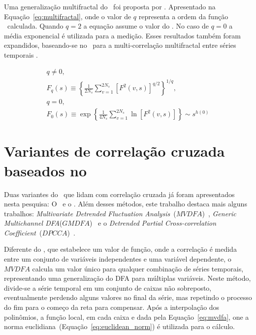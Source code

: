 Uma generalização multifractal do \dfa~foi proposta por . Apresentado na Equação~\ref{eq:multifractal}, onde o valor de $q$ representa a ordem da função \dfa~calculada. Quando $q=2$ a equação assume o valor do \dfa. No caso de $q=0$ a média exponencial é utilizada para a medição. Esses resultados também foram expandidos, baseando-se no \dcca~para a multi-correlação multifractal entre séries temporais \cite{zhouMultifractalDetrendedCrosscorrelation2008}.

\begin{equation}\label{eq:multifractal}
  \begin{split}
  q \neq 0,
  \\[10pt]
  F_q(s) \equiv \left\{ \frac{1}{2N_s} \sum_{v=1}^{2N_s} \left[ F^2(v,s) \right]^{q/2} \right\}^{1/q},
  \\[10pt]
  q=0,
  \\[10pt]
  F_0(s) \equiv \exp\left\{ \frac{1}{4N_s} \sum_{v=1}^{2N_s} \ln\left[ F^2(v,s) \right] \right\} \sim s^{h(0)}
  \end{split}
  \end{equation}

\section{Variantes de correlação cruzada baseados no \dcca}
\label{ss:vari_cross}

Duas variantes do \dcca~que lidam com correlação cruzada já foram apresentados nesta pesquisa: O \pdcca~e o \dmc. Além desses métodos, este trabalho destaca mais alguns trabalhos: \textit{Multivariate Detrended Fluctuation Analysis}~($MVDFA$)~\cite{xiongDetrendedFluctuationAnalysis2017}, \textit{Generic Multichannel DFA}($GMDFA$)~\cite{naveedFullyMultivariateDetrended2025} e o \textit{Detrended Partial Cross-correlation Coefficient}~($DPCCA$)~\cite{yuanDetrendedPartialCrossCorrelationAnalysis2015}.

Diferente do \dmc, que estabelece um valor de função, onde a correlação é medida entre um conjunto de variáveis independentes e uma variável dependente, o $MVDFA$ calcula um valor único para qualquer combinação de séries temporais, representando uma generalização do DFA para múltiplas variáveis. Neste método, divide-se a série temporal em um conjunto de caixas não sobreposto, eventualmente perdendo alguns valores no final da série, mas repetindo o processo do fim para o começo da reta para compensar. Após a interpolação dos polinômios, a função local, em cada caixa e dada pela Equação~\ref{eq:mvdfa}, one a norma euclidiana~(Equação~\ref{eq:euclidean_norm}) é utilizada para o cálculo.


